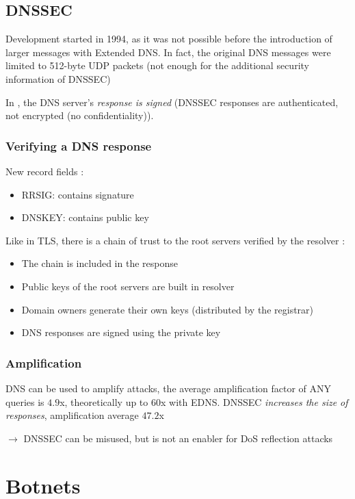 \section{DNSSEC}

Development started in 1994, as it was not possible before the introduction of larger messages with Extended DNS. In fact, the original DNS messages were limited to 512-byte UDP packets (not enough for the additional security information of DNSSEC)

In , the DNS server’s \textit{response is signed} (DNSSEC responses are authenticated, not encrypted (no confidentiality)).

\subsection{Verifying a DNS response}

New record fields :
\begin{itemize}
    \item RRSIG: contains signature
    \item DNSKEY: contains public key
\end{itemize}

Like in TLS, there is a chain of trust to the root servers verified by the resolver :
\begin{itemize}
    \item The chain is included in the response
    \item Public keys of the root servers are built in resolver
    \item Domain owners generate their own keys (distributed by the registrar)
    \item DNS responses are signed using the private key
\end{itemize}

\subsection{Amplification}

DNS can be used to amplify attacks, the average amplification factor of ANY queries is $4.9$x, theoretically up to $60$x with EDNS. DNSSEC \textit{increases the size of responses}, amplification average $47.2$x

$\rightarrow$ DNSSEC can be misused, but is not an enabler for DoS reflection attacks

\chapter{Botnets}

